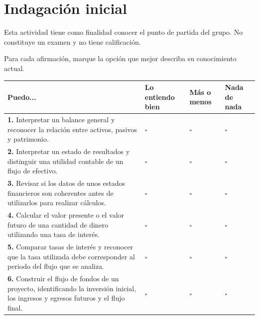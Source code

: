 \documentclass[12pt,a4paper]{article}
\begin{document}
\section{Indagación inicial}

Esta actividad tiene como finalidad conocer el punto de partida del grupo.
No constituye un examen y no tiene calificación.

\vspace{0.2cm}

\noindent
Para cada afirmación, marque la opción que mejor describa su conocimiento actual.

\vspace{0.3cm}

\begin{table}[H]
\centering
\footnotesize
\renewcommand{\arraystretch}{1.35}

\begin{tabularx}{\textwidth}{
    >{\raggedright\arraybackslash}X
    >{\centering\arraybackslash}p{1.8cm}
    >{\centering\arraybackslash}p{1.8cm}
    >{\centering\arraybackslash}p{1.8cm}
}
\toprule
\textbf{Puedo...} &
\textbf{Lo entiendo bien} &
\textbf{Más o menos} &
\textbf{Nada de nada} \\
\midrule

\textbf{1.} Interpretar un balance general y reconocer la relación entre activos, pasivos y patrimonio.
& $\square$ & $\square$ & $\square$ \\

\textbf{2.} Interpretar un estado de resultados y distinguir una utilidad contable de un flujo de efectivo.
& $\square$ & $\square$ & $\square$ \\

\textbf{3.} Revisar si los datos de unos estados financieros son coherentes antes de utilizarlos para realizar cálculos.
& $\square$ & $\square$ & $\square$ \\

\textbf{4.} Calcular el valor presente o el valor futuro de una cantidad de dinero utilizando una tasa de interés.
& $\square$ & $\square$ & $\square$ \\

\textbf{5.} Comparar tasas de interés y reconocer que la tasa utilizada debe corresponder al periodo del flujo que se analiza.
& $\square$ & $\square$ & $\square$ \\

\textbf{6.} Construir el flujo de fondos de un proyecto, identificando la inversión inicial, los ingresos y egresos futuros y el flujo final.
& $\square$ & $\square$ & $\square$ \\


\end{tabularx}
\end{table}
\end{document}
